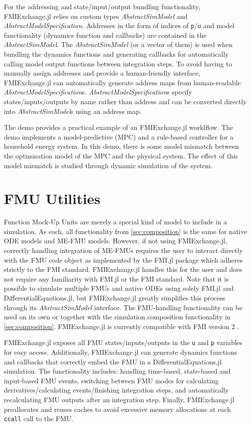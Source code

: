 \documentclass{juliacon}
\newcommand{\typename}[1]{\textit{#1}}
\begin{document}
For the addressing and state/input/output bundling functionality, FMIExchange.jl relies on custom types \typename{AbstractSimModel} and \typename{AbstractModelSpecification}.
Addresses in the form of indices of \texttt{p}/\texttt{u} and model functionality (dynamics function and callbacks) are contained in the \typename{AbstractSimModel}.
The \typename{AbstractSimModel} (or a vector of them) is used when bundling the dynamics functions and generating callbacks for automatically calling model output functions between integration steps.
To avoid having to manually assign addresses and provide a human-friendly interface, FMIExchange.jl can automatically generate address maps from human-readable \typename{AbstractModelSpecification}s.
\typename{AbstractModelSpecification}s specify states/inputs/outputs by name rather than address and can be converted directly into \typename{AbstractSimModel}s using an address map.

The demo \cite{bex2024} provides a practical example of an FMIExchange.jl worklflow.
The demo implements a model-predictive (MPC) and a rule-based controller for a household energy system.
In this demo, there is some model mismatch between the optimisation model of the MPC and the physical system.
The effect of this model mismatch is studied through dynamic simulation of the system.

\section{FMU Utilities}
Function Mock-Up Units are merely a special kind of model to include in a simulation.
As such, all functionality from \cref{sec:composition} is the same for native ODE models and ME-FMU models.
However, if not using FMIExchange.jl, correctly handling integration of ME-FMUs requires the user to interact directly with the FMU code object as implemented by the FMI.jl package which adheres strictly to the FMI standard.
FMIExchange.jl handles this for the user and does not require any familiarity with FMI.jl or the FMI standard.
Note that it is possible to simulate multiple FMUs and native ODEs using solely FMI.jl and DifferentialEquations.jl, but FMIExchange.jl greatly simplifies this process through its \typename{AbstractSimModel} interface.
The FMU-handling functionality can be used on its own or together with the simulation composition functionality in \cref{sec:composition}.
FMIExchange.jl is currently compatible with FMI version 2 \cite{modelicaassociation2022}.

FMIExchange.jl exposes all FMU states/inputs/outputs in the \texttt{u} and \texttt{p} variables for easy access.
Additionally, FMIExchange.jl can generate dynamics functions and callbacks that correctly embed the FMU in a DifferentialEquations.jl simulation.
The functionality includes: handling time-based, state-based and input-based FMU events, switching between FMU modes for calculating derivatives/calculating events/finishing integration steps, and automatically recalculating FMU outputs after an integration step.
Finally, FMIExchange.jl preallocates and reuses caches to avoid excessive memory allocations at each \texttt{ccall} call to the FMU.
\end{document}
